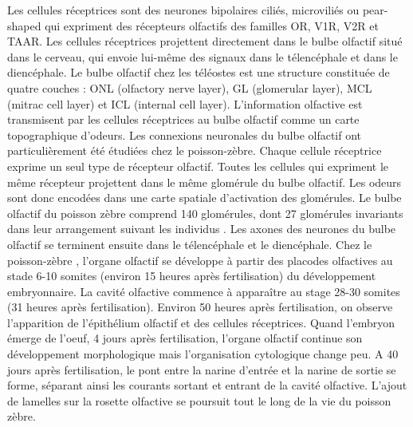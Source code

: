   Les cellules réceptrices sont des neurones bipolaires ciliés, microviliés \cite{ichikawa1977fine} ou pear-shaped \cite{wakisaka2017adenosine} qui expriment des récepteurs olfactifs des familles OR, V1R, V2R et TAAR. Les cellules réceptrices projettent directement dans le bulbe olfactif situé dans le cerveau, qui envoie lui-même des signaux dans le télencéphale et dans le diencéphale. Le bulbe olfactif chez les téléostes est une structure constituée de quatre couches : ONL (olfactory nerve layer), GL (glomerular layer), MCL (mitrac cell layer) et ICL (internal cell layer). L'information olfactive est transmisent par les cellules réceptrices au bulbe olfactif comme un carte topographique d'odeurs. Les connexions neuronales du bulbe olfactif ont particulièrement été étudiées chez le poisson-zèbre. Chaque cellule réceptrice exprime un seul type de récepteur olfactif. Toutes les cellules qui expriment le même récepteur projettent dans le même glomérule du bulbe olfactif. Les odeurs sont donc encodées dans une carte spatiale d'activation des glomérules. Le bulbe olfactif du poisson zèbre comprend 140 glomérules, dont 27 glomérules invariants dans leur arrangement suivant les individus \cite{braubach2012distribution}. Les axones des neurones du bulbe olfactif se terminent ensuite dans le télencéphale et le diencéphale.
  \medbreak
  Chez le poisson-zèbre \cite{hansen1993development}, l'organe olfactif se développe à partir des placodes olfactives au stade 6-10 somites (environ 15 heures après fertilisation) du développement embryonnaire. La cavité olfactive commence à apparaître au stage 28-30 somites (31 heures après fertilisation). Environ 50 heures après fertilisation, on observe l'apparition de l'épithélium olfactif et des cellules réceptrices. Quand l'embryon émerge de l'oeuf, 4 jours après fertilisation, l'organe olfactif continue son développement morphologique mais l'organisation cytologique change peu. A 40 jours après fertilisation, le pont entre la narine d'entrée et la narine de sortie se forme, séparant ainsi les courants sortant et entrant de la cavité olfactive. L'ajout de lamelles sur la rosette olfactive se poursuit tout le long de la vie du poisson zèbre.

